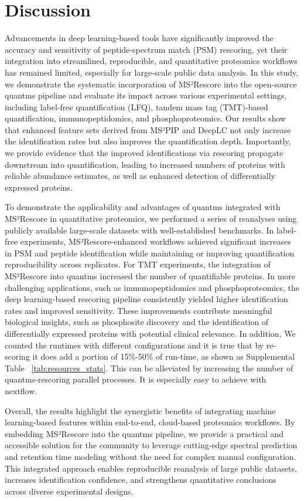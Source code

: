 \documentclass[12pt]{article}
\begin{document}
\section{Discussion}
Advancements in deep learning-based tools have significantly improved the accuracy and sensitivity of peptide-spectrum match (PSM) rescoring, yet their integration into streamlined, reproducible, and quantitative proteomics workflows has remained limited, especially for large-scale public data analysis. In this study, we demonstrate the systematic incorporation of MS²Rescore into the open-source quantms pipeline and evaluate its impact across various experimental settings, including label-free quantification (LFQ), tandem mass tag (TMT)-based quantification, immunopeptidomics, and phosphoproteomics. Our results show that enhanced feature sets derived from MS²PIP and DeepLC not only increase the identification rates but also improves the quantification depth. Importantly, we provide evidence that the improved identifications via rescoring propagate downstream into quantification, leading to increased numbers of proteins with reliable abundance estimates, as well as enhanced detection of differentially expressed proteins.

To demonstrate the applicability and advantages of quantms integrated with MS²Rescore in quantitative proteomics, we performed a series of reanalyses using publicly available large-scale datasets with well-established benchmarks. In label-free experiments, MS²Rescore-enhanced workflows achieved significant increases in PSM and peptide identification while maintaining or improving quantification reproducibility across replicates. For TMT experiments, the integration of MS²Rescore into quantms increased the number of quantifiable proteins. In more challenging applications, such as immunopeptidomics and phosphoproteomics, the deep learning-based rescoring pipeline consistently yielded higher identification rates and improved sensitivity. These improvements contribute meaningful biological insights, such as phosphosite discovery and the identification of differentially expressed proteins with potential clinical relevance. In addition, We counted the runtimes with different configurations and it is true that by re-scoring it does add a portion of 15\%-50\% of run-time, as shown as Supplemental Table ~\ref{tab:resources_stats}. This can be alleviated by increasing the number of quantms-rescoring parallel processes. It is especially easy to achieve with nextflow.

Overall, the results highlight the synergistic benefits of integrating machine learning-based features within end-to-end, cloud-based proteomics workflows. By embedding MS²Rescore into the quantms pipeline, we provide a practical and accessible solution for the community to leverage cutting-edge spectral prediction and retention time modeling without the need for complex manual configuration. This integrated approach enables reproducible reanalysis of large public datasets, increases identification confidence, and strengthens quantitative conclusions across diverse experimental designs.
\end{document}
